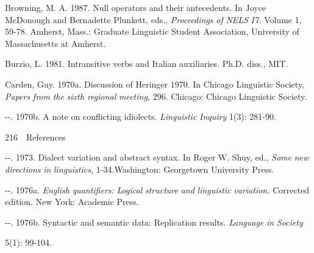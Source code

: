 \begin{styleStandard}
Browning, M. A. 1987. Null operators and their antecedents. In Joyce McDonough and Bernadette Plunkett, eds., \textit{Proceedings}\textit{ }\textit{of}\textit{ }\textit{NELS}\textit{ }\textit{I7.}\textit{ }Volume 1, 59-78. Amherst, Mass.: Graduate Linguistic Student Association, University of Massachusetts at Amherst.
\end{styleStandard}


\begin{styleStandard}
Burzio, L. 1981. Intransitive verbs and Italian auxiliaries. Ph.D. diss., MIT.
\end{styleStandard}


\begin{styleStandard}
Carden, Guy. 1970a. Discussion of Heringer 1970. In Chicago Linguistic Society, \textit{Papers}\textit{ }\textit{from}\textit{ }\textit{the}\textit{ }\textit{sixth regional}\textit{ }\textit{meeting,}\textit{ }296. Chicago: Chicago Linguistic Society.
\end{styleStandard}


\begin{listWWNumxleveli}
\item 
\begin{styleStandard}
{}-{}-. 1970b. A note on conflicting idiolects. \textit{Linguistic}\textit{ }\textit{Inquiry}\textit{ }1(3): 281-90.
\end{styleStandard}


\end{listWWNumxleveli}
\clearpage\setcounter{page}{1}\begin{styleStandard}
216\ \ References
\end{styleStandard}


\begin{listWWNumxleveli}
\item 
\begin{styleStandard}
{}-{}-. 1973. Dialect variation and abstract syntax. In Roger W. Shuy, ed., \textit{Some}\textit{ }\textit{new}\textit{ }\textit{directions}\textit{ }\textit{in}\textit{ }\textit{linguistics,}\textit{ }1-34.Washington: Georgetown University Press.
\end{styleStandard}


\item 
\begin{styleStandard}
{}-{}-. 1976a. \textit{English}\textit{ }\textit{quantifiers:}\textit{ }\textit{Logical}\textit{ }\textit{structure}\textit{ }\textit{and}\textit{ }\textit{linguistic}\textit{ }\textit{variation.}\textit{ }Corrected edition. New York: Academic Press.
\end{styleStandard}


\item 
\begin{styleStandard}
{}-{}-. 1976b. Syntactic and semantic data: Replication results. \textit{Language}\textit{ }\textit{in}\textit{ }\textit{Society}
\end{styleStandard}


\end{listWWNumxleveli}
\begin{styleStandard}
5(1): 99-104.
\end{styleStandard}


